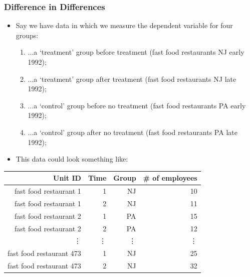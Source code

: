 \documentclass[aspectratio=169]{beamer}
\theoremstyle{principle}
\begin{document}
\begin{frame}
\frametitle{Difference in Differences}

\begin{itemize}
\item Say we have data in which we measure the dependent variable for four groups:
\begin{enumerate}
\item ...a `treatment' group before treatment \color{white}(fast food restaurants NJ early 1992);
\item \color{black}...a `treatment' group after treatment \color{white}(fast food restaurants NJ late 1992);
\item \color{black}...a `control' group before no treatment \color{white}(fast food restaurants PA early 1992);
\item \color{black}...a `control' group after no treatment \color{white}(fast food restaurants PA late 1992);
\end{enumerate}
\bigskip

\item[]\color{white} This data could look something like:
\end{itemize}

 \color{white}
\begin{table}[ht]
\centering
\begin{tabular}{rrrr}
 \hline
  \hline
Unit ID & Time & Group & \# of employees \\ 
  \hline
    \hline
fast food restaurant 1& 1 & NJ & 10 \\ 
fast food restaurant 1 & 2 & NJ & 11 \\ 
fast food restaurant 2 & 1 & PA & 15 \\ 
fast food restaurant 2 & 2 & PA & 12 \\ 
\vdots&\vdots&\vdots&\vdots\\
fast food restaurant 473 & 1 & NJ & 25 \\ 
fast food restaurant 473 & 2 & NJ & 32 \\ 
   \hline
      \hline
\end{tabular}
\end{table}

\end{frame}
\end{document}
